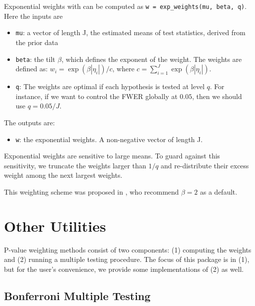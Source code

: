 \documentclass[english,11pt]{article} %
\begin{document}
Exponential weights with can be computed as \verb+w = exp_weights(mu, beta, q)+. Here the inputs are 

\begin{itemize}
\item \verb+mu+:  a vector of length J, the estimated means of test statistics, derived from the prior data
\item \verb+beta+:  the tilt $\beta$, which defines the exponent of the weight. The weights are defined as: $w_i = \exp(\beta|\eta_i|)/c$, where $c = \sum_{i=1}^{J}  \exp(\beta |\eta_i|)$.
\item \verb+q+: The weights are optimal if each hypothesis is tested at level $q$. For instance, if we want to control the FWER globally at $0.05$, then we should use $q = 0.05/J$.
\end{itemize}

The outputs are: 
\begin{itemize}
\item \verb+w+:  the exponential weights. A non-negative vector of length J.
\end{itemize}

Exponential weights are sensitive to large means. To guard against this sensitivity, we truncate the weights larger than $1/q$ and re-distribute their excess weight among the next largest weights. 

This weighting scheme was proposed in \citep{roeder2006using}, who recommend $\beta = 2$ as a default. 


\section{Other Utilities}
\label{methods_plus}

P-value weighting methods consist of two components: (1) computing the weights and (2) running a multiple testing procedure. The focus of this package is in (1), but for the user's convenience, we provide some implementations of (2) as well.

\subsection{Bonferroni Multiple Testing}
\end{document}
